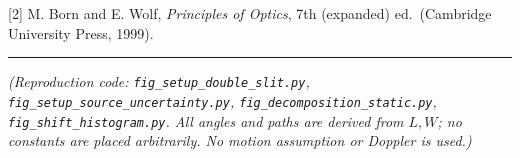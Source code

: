 \documentclass[
]{article}
\begin{document}
{[}2{]} M. Born and E. Wolf, \emph{Principles of Optics}, 7th (expanded)
ed.~(Cambridge University Press, 1999).

\begin{center}\rule{0.5\linewidth}{0.5pt}\end{center}

\emph{(Reproduction code: \texttt{fig\_setup\_double\_slit.py},
\texttt{fig\_setup\_source\_uncertainty.py},
\texttt{fig\_decomposition\_static.py},
\texttt{fig\_shift\_histogram.py}. All angles and paths are derived from
\(L,W\); no constants are placed arbitrarily. No motion assumption or
Doppler is used.)}
\end{document}
